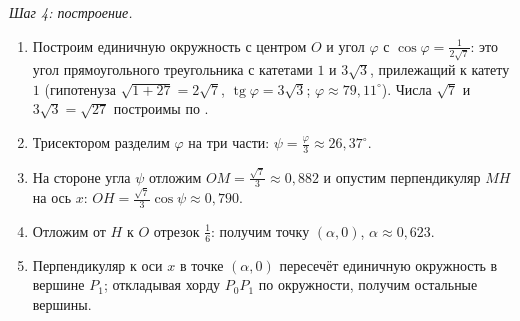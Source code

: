 \emph{Шаг 4: построение.}
\begin{enumerate}
\item Построим единичную окружность с центром $O$ и угол $\varphi$ с $\cos\varphi=\frac1{2\sqrt7}$: это угол прямоугольного
треугольника с катетами $1$ и $3\sqrt3$, прилежащий к катету $1$ (гипотенуза $\sqrt{1+27}=2\sqrt7$, $\operatorname{tg}\varphi=3\sqrt3$;
$\varphi\approx79{,}11^\circ$). Числа $\sqrt7$ и $3\sqrt3=\sqrt{27}$ построимы по .
\item Трисектором разделим $\varphi$ на три части: $\psi=\frac\varphi3\approx26{,}37^\circ$.
\item На стороне угла $\psi$ отложим $OM=\frac{\sqrt7}3\approx0{,}882$ и опустим перпендикуляр $MH$ на ось $x$:
$OH=\frac{\sqrt7}3\cos\psi\approx0{,}790$.
\item Отложим от $H$ к $O$ отрезок $\frac16$: получим точку $(\alpha,0)$, $\alpha\approx0{,}623$.
\item Перпендикуляр к оси $x$ в точке $(\alpha,0)$ пересечёт единичную окружность в вершине $P_1$; откладывая хорду
$P_0P_1$ по окружности, получим остальные вершины.
\end{enumerate}

